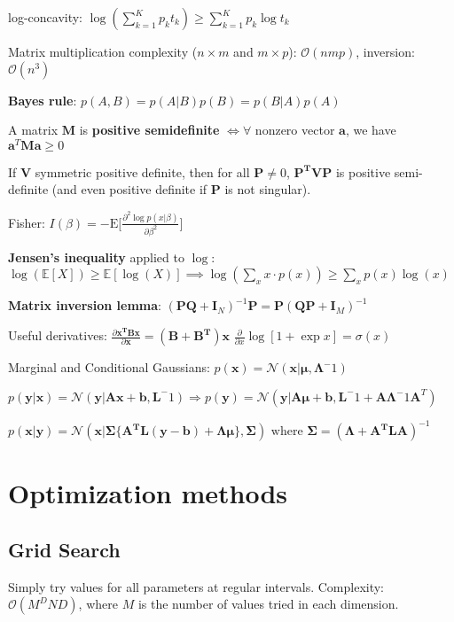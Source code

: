 \documentclass[10pt,a4paper,landscape]{extarticle}
\renewcommand{\bf}[1]{\ensuremath{\mathbf{#1}}}
\newcommand{\E}{\mathrm{E}}
\begin{document}
\begin{multicols*}{4}
log-concavity: $\log ( \sum_{k=1}^K p_k t_k) \geq \sum_{k=1}^K p_k \log t_k$

Matrix multiplication complexity ($n \times m$ and $m \times p$): $\mathcal{O}(nmp)$, inversion: $\mathcal{O}(n^3)$

\textbf{Bayes rule}: $p(A, B) = p(A|B) p(B) = p(B|A) p(A)$

A matrix $\bf{M}$ is \textbf{positive semidefinite} $\iff \forall$ nonzero vector $\bf{a}$, we have $\bf{a}^T \bf{M} \bf{a} \geq 0$

If $\bf{V}$ symmetric positive definite, then for all $\bf{P} \neq 0$, $\bf{P^T V P}$ is positive semi-definite (and even positive definite if $\bf{P}$ is not singular).

Fisher: $I(\beta) = -\E\biggl[\frac{\partial^2 \log p(x|\beta)}{\partial\beta^2}\biggr]$

\textbf{Jensen's inequality} applied to $\log$: $\log( \mathbb{E}[X] ) \geq \mathbb{E}[\log(X)]
\implies \log ( \sum_x x \cdot p(x) ) \geq \sum_x p(x) \log(x)$

\textbf{Matrix inversion lemma}: $(\bf{PQ} + \bf{I}_N)^{-1} \bf{P} = \bf{P}(\bf{QP} + \bf{I}_M)^{-1}$

Useful derivatives: $\frac{\partial \bf{x^T B x}}{\partial \bf{x}} = (\bf{B + B^T}) \bf{x}$
$\frac{\partial}{\partial x} \log[1+\exp{x}] = \sigma(x)$

Marginal and Conditional Gaussians:
$p(\bf{x}) = \mathcal{N}(\bf{x} | \boldsymbol\mu, \boldsymbol\Lambda^-1)$ 

$p(\bf{y}|\bf{x}) = \mathcal{N}(\bf{y} | \bf{Ax + b, L}^-1)
\Rightarrow
p(\bf{y}) = \mathcal{N}(\bf{y} | \bf{A} \boldsymbol\mu + \bf{b}, \bf{L}^-1 + \bf{A} \boldsymbol\Lambda^-1 \bf{A}^T)$

$p(\bf{x}|\bf{y}) = \mathcal{N}(\bf{x} |\boldsymbol\Sigma \{ \bf{A^T L(y - b) + \Lambda \mu} \}, \boldsymbol\Sigma)
\text{ where } \boldsymbol\Sigma = (\boldsymbol\Lambda + \bf{A^T L A})^{-1}
$

\section{Optimization methods}

\subsection{Grid Search}
Simply try values for all parameters at regular intervals.
Complexity: $\mathcal{O}(M^D N D)$, where $M$ is the number of values tried in each dimension.


\end{multicols*}
\end{document}
